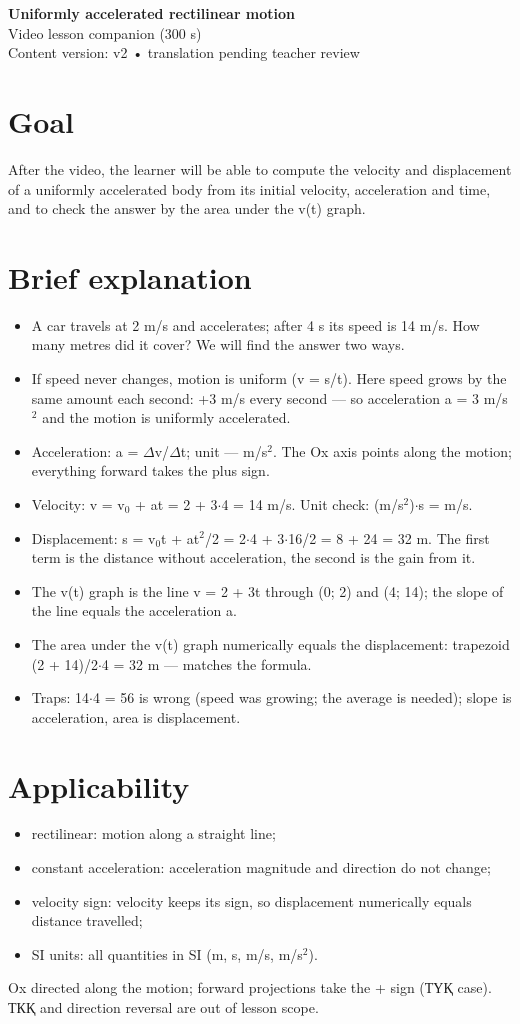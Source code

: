 \documentclass[11pt]{article}
\begin{document}
{\Large\bfseries Uniformly accelerated rectilinear motion}\\[2mm]
Video lesson companion (300 s)\\[1mm]
{\small Content version: v2 • translation pending teacher review}
\vspace{4mm}
\section*{Goal}
After the video, the learner will be able to compute the velocity and displacement of a uniformly accelerated body from its initial velocity, acceleration and time, and to check the answer by the area under the v(t) graph.
\section*{Brief explanation}
\begin{itemize}
\item A car travels at 2 m/s and accelerates; after 4 s its speed is 14 m/s. How many metres did it cover? We will find the answer two ways.
\item If speed never changes, motion is uniform (v = s/t). Here speed grows by the same amount each second: +3 m/s every second — so acceleration a = 3 m/s$^2$ and the motion is uniformly accelerated.
\item Acceleration: a = $\Delta$v/$\Delta$t; unit — m/s$^2$. The Ox axis points along the motion; everything forward takes the plus sign.
\item Velocity: v = v$_0$ + at = 2 + 3$\cdot$4 = 14 m/s. Unit check: (m/s$^2$)$\cdot$s = m/s.
\item Displacement: s = v$_0$t + at$^2$/2 = 2$\cdot$4 + 3$\cdot$16/2 = 8 + 24 = 32 m. The first term is the distance without acceleration, the second is the gain from it.
\item The v(t) graph is the line v = 2 + 3t through (0; 2) and (4; 14); the slope of the line equals the acceleration a.
\item The area under the v(t) graph numerically equals the displacement: trapezoid (2 + 14)/2$\cdot$4 = 32 m — matches the formula.
\item Traps: 14$\cdot$4 = 56 is wrong (speed was growing; the average is needed); slope is acceleration, area is displacement.
\end{itemize}
\section*{Applicability}
\begin{itemize}
\item rectilinear: motion along a straight line;
\item constant acceleration: acceleration magnitude and direction do not change;
\item velocity sign: velocity keeps its sign, so displacement numerically equals distance travelled;
\item SI units: all quantities in SI (m, s, m/s, m/s$^2$).
\end{itemize}
Ox directed along the motion; forward projections take the + sign (ТҮҚ case). ТКҚ and direction reversal are out of lesson scope.
\end{document}
